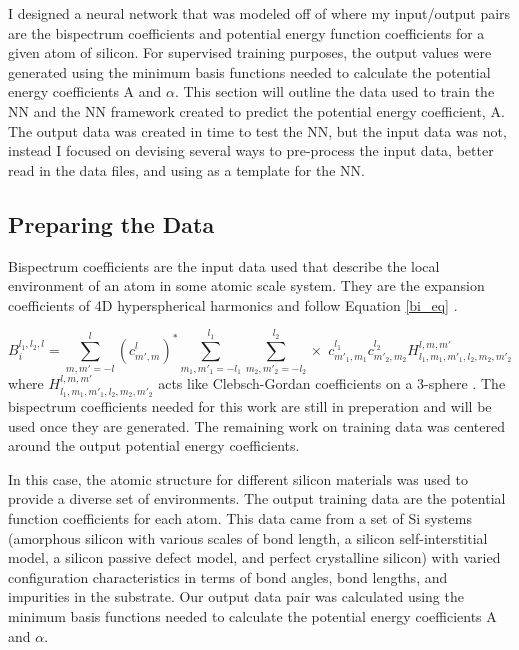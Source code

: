 \documentclass{article}
\begin{document}
I designed a neural network that was modeled off of \cite{Yanxon2020} where my 
input/output pairs are the bispectrum coefficients and potential energy function coefficients 
for a given atom of silicon. For supervised training purposes, the output values were generated 
using the minimum basis functions needed to calculate the 
potential energy coefficients A and $\alpha$. This section will outline the data used to train 
the NN and the NN framework created to predict the potential energy coefficient, A. The output 
data was created in time to test the NN, but the input data was not, instead I focused on 
devising several ways to pre-process the input data, better read in the data files, and using 
\cite{Yanxon2020} as a template for the NN.

\subsection{Preparing the Data}

Bispectrum coefficients are the input data used that describe the local environment of an atom 
in some atomic scale system. They are the expansion coefficients of 4D hyperspherical harmonics 
and follow Equation \ref{bi_eq} \citep{Yanxon2020}. 

\begin{equation}
    B_{i}^{l_{1}, l_{2}, l} = \sum_{m, m'=-l}^{l} (c^{l}_{m',m})^{*} \sum_{m_{1}, m'_{1}=-l_{1}}^{l_{1}} \sum_{m_{2}, m'_{2}=-l_{2}}^{l_{2}}
    \times \; c^{l_{1}}_{m'_{1},m_{1}} c^{l_{2}}_{m'_{2},m_{2}} H^{l,m,m'}_{l_{1},m_{1},m'_{1},l_{2},m_{2},m'_{2}}
    \label{bi_eq}
\end{equation}
\noindent
where $H^{l,m,m'}_{l_{1},m_{1},m'_{1},l_{2},m_{2},m'_{2}}$ acts like Clebsch-Gordan coefficients on a 3-sphere 
\citep{Yanxon2020}. The bispectrum coefficients needed for this work are still in preperation and will be used
once they are generated. The remaining work on training data was centered around the output potential energy 
coefficients.

In this case, the atomic structure for different silicon materials 
was used to provide a diverse set of environments. The output training data are the potential 
function coefficients for each atom. This data came from a set of Si systems (amorphous silicon 
with various scales of bond length, a silicon self-interstitial model, a silicon passive defect 
model, and perfect crystalline silicon) with varied configuration characteristics in terms 
of bond angles, bond lengths, and impurities in the substrate. Our output data pair was calculated 
using the minimum basis functions needed to calculate the potential energy coefficients A and $\alpha$. 
\end{document}
